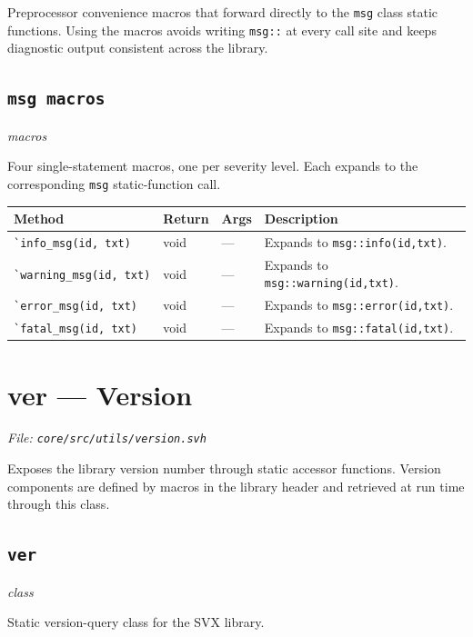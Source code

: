 \documentclass[11pt,letterpaper]{report}
\begin{document}
Preprocessor convenience macros that forward directly to the \texttt{msg} class static functions. Using the macros avoids writing \texttt{msg::} at every call site and keeps diagnostic output consistent across the library.

\subsection*{\texttt{msg macros}}
\noindent\small\textit{macros}\par

Four single-statement macros, one per severity level. Each expands to the corresponding \texttt{msg} static-function call.

\begin{xltabular}{\linewidth}{>{\small}p{1.35in} >{\small}p{1.25in} >{\small}p{0.95in} >{\small}X}
\toprule
\textbf{Method} & \textbf{Return} & \textbf{Args} & \textbf{Description} \\
\midrule
\endhead
\bottomrule
\endfoot
\texttt{\`{}info\_msg(id,\ txt)} & void & --- & Expands to \texttt{msg::info(id,txt)}. \\
\texttt{\`{}warning\_msg(id,\ txt)} & void & --- & Expands to \texttt{msg::warning(id,txt)}. \\
\texttt{\`{}error\_msg(id,\ txt)} & void & --- & Expands to \texttt{msg::error(id,txt)}. \\
\texttt{\`{}fatal\_msg(id,\ txt)} & void & --- & Expands to \texttt{msg::fatal(id,txt)}. \\
\end{xltabular}

\section{ver --- Version}
\noindent\small\textit{File: \texttt{core/src/utils/version.svh}}\par

Exposes the library version number through static accessor functions. Version components are defined by macros in the library header and retrieved at run time through this class.

\subsection*{\texttt{ver}}
\noindent\small\textit{class}\par

Static version-query class for the SVX library.
\end{document}
